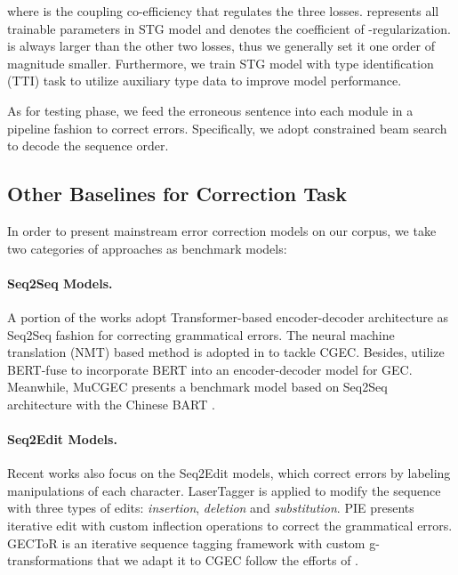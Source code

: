 \documentclass[11pt]{article}
\begin{document}
where  is the coupling co-efficiency that regulates the three losses. represents all trainable parameters in STG model and  denotes the coefficient of -regularization.  is always larger than the other two losses, thus we generally set it one order of magnitude smaller. Furthermore, we train STG model with type identification (TTI) task to utilize auxiliary type data to improve model performance.

As for testing phase, we feed the erroneous sentence into each module in a pipeline fashion to correct errors. Specifically, we adopt constrained beam search to decode the sequence order.

\subsection{Other Baselines for Correction Task}
\label{sec:benchmrk-gec}

In order to present mainstream error correction models on our corpus, we take two categories of approaches as benchmark models:

\paragraph{Seq2Seq Models.} A portion of the works adopt Transformer-based \cite{vaswani2017attention} encoder-decoder architecture as Seq2Seq fashion for correcting grammatical errors. The neural machine translation (NMT) based method is adopted in \citet{fu2018youdao} to tackle CGEC. Besides, \citet{kaneko2020encoder} utilize BERT-fuse to incorporate BERT into an encoder-decoder model for GEC. Meanwhile, MuCGEC \cite{zhang2022mucgec} presents a benchmark model based on Seq2Seq architecture with the Chinese BART \cite{shao2021cpt}.

\paragraph{Seq2Edit Models.} Recent works also focus on the Seq2Edit models, which correct errors by labeling manipulations of each character. LaserTagger \cite{malmi2019encode} is applied to modify the sequence with three types of edits: \emph{insertion}, \emph{deletion} and \emph{substitution}. PIE \cite{awasthi2019parallel} presents iterative edit with custom inflection operations to correct the grammatical errors. GECToR \cite{omelianchuk2020gector} is an iterative sequence tagging framework with custom g-transformations that we adapt it to CGEC follow the efforts of \citet{zhang2022mucgec}. 
\end{document}
